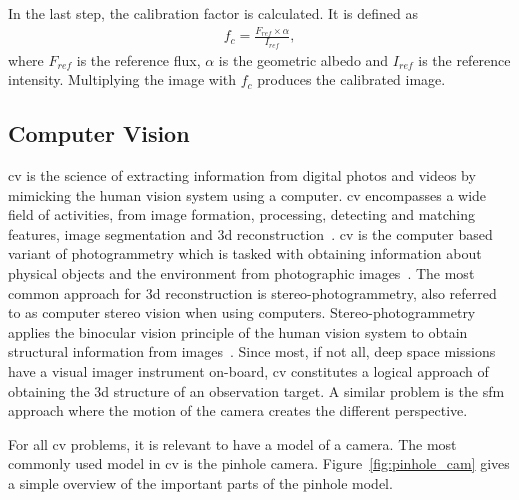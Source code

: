 In the last step, the calibration factor is calculated. It is defined as
\begin{align}
    f_c = \frac{F_{ref} \times \alpha}{I_{ref}}, \label{eq:comp_cal_fac}
\end{align}
where $F_{ref}$ is the reference flux, $\alpha$ is the geometric albedo and $I_{ref}$ is the reference intensity. Multiplying the image with $f_c$ produces the calibrated image.

\subsection{Computer Vision} \label{sec:t_cv}
\Gls{cv} is the science of extracting information from digital photos and videos by mimicking the human vision system using a computer. \Gls{cv} encompasses a wide field of activities, from image formation, processing, detecting and matching features, image segmentation and \gls{3d} reconstruction~\cite{szeliski2010computer}. \Gls{cv} is the computer based variant of photogrammetry which is tasked with obtaining information about physical objects and the environment from photographic images~\cite{Kasser2002DigitalPhotogrammetry}. The most common approach for \gls{3d} reconstruction is stereo-photogrammetry, also referred to as computer stereo vision when using computers. Stereo-photogrammetry applies the binocular vision principle of the human vision system to obtain structural information from images~\cite{do2019review}. Since most, if not all, deep space missions have a visual imager instrument on-board, \gls{cv} constitutes a logical approach of obtaining the \gls{3d} structure of an observation target. A similar problem is the \gls{sfm} approach where the motion of the camera creates the different perspective.

For all \gls{cv} problems, it is relevant to have a model of a camera. The most commonly used model in \gls{cv} is the pinhole camera. Figure~\ref{fig:pinhole_cam} gives a simple overview of the important parts of the pinhole model.

